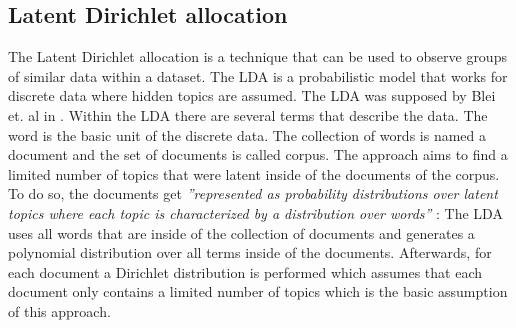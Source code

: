 \subsection{Latent Dirichlet allocation} %
\label{sub:lda}


The Latent Dirichlet allocation is a technique that can be used to observe groups of similar data within a dataset. The LDA is a probabilistic model that works for discrete data where hidden topics are assumed. The LDA was supposed by Blei et. al in \cite{blei_latent_nodate}.
Within the LDA there are several terms that describe the data. The word is the basic unit of the discrete data. The collection of words is named a document and the set of documents is called corpus.
The approach aims to find a limited number of topics that were latent inside of the documents of the corpus. To do so, the documents get \textit{''represented as probability distributions over latent topics where each topic is characterized  by a distribution over words''} \cite{niu_topic2vec_2015}:
The LDA uses all words that are inside of the collection of documents and generates a polynomial distribution over all terms inside of the documents. Afterwards, for each document a Dirichlet distribution is performed which assumes that each document only contains a limited number of topics which is the basic assumption of this approach.
